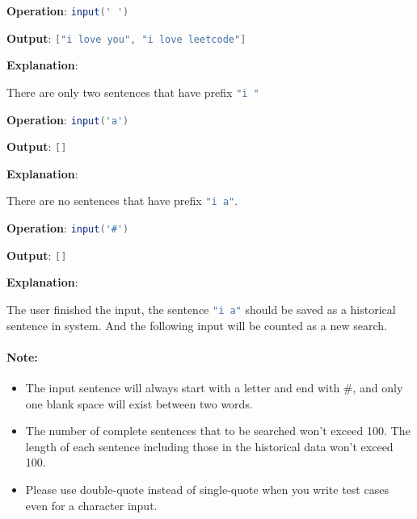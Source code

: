 \begin{flushleft}
\textbf{Operation}: \lstinline[language=Java, basicstyle=\small\ttfamily, keywordstyle=\bfseries\color{green!40!black}]|input(' ')|

\textbf{Output}: \lstinline[language=Java, basicstyle=\small\ttfamily, keywordstyle=\bfseries\color{green!40!black}]|["i love you", "i love leetcode"]|

\textbf{Explanation}:

There are only two sentences that have prefix \lstinline[language=Java, basicstyle=\small\ttfamily, keywordstyle=\bfseries\color{green!40!black}]|"i "|

\textbf{Operation}: \lstinline[language=Java, basicstyle=\small\ttfamily, keywordstyle=\bfseries\color{green!40!black}]|input('a')|

\textbf{Output}: \lstinline[language=Java, basicstyle=\small\ttfamily, keywordstyle=\bfseries\color{green!40!black}]|[]|

\textbf{Explanation}:

There are no sentences that have prefix \lstinline[language=Java, basicstyle=\small\ttfamily, keywordstyle=\bfseries\color{green!40!black}]|"i a"|.

\textbf{Operation}: \lstinline[language=Java, basicstyle=\small\ttfamily, keywordstyle=\bfseries\color{green!40!black}]|input('#')|

\textbf{Output}: \lstinline[language=Java, basicstyle=\small\ttfamily, keywordstyle=\bfseries\color{green!40!black}]|[]|

\textbf{Explanation}:

The user finished the input, the sentence \lstinline[language=Java, basicstyle=\small\ttfamily, keywordstyle=\bfseries\color{green!40!black}]|"i a"| should be saved as a historical sentence in system. And the following input will be counted as a new search.
 

\end{flushleft}

\paragraph{Note:}

\begin{itemize}
\item The input sentence will always start with a letter and end with \#, and only one blank space will exist between two words.
\item The number of complete sentences that to be searched won't exceed 100. The length of each sentence including those in the historical data won't exceed 100.
\item Please use double-quote instead of single-quote when you write test cases even for a character input.
\end{itemize}


